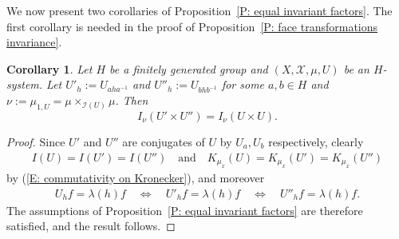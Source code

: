 \documentclass[11pt]{amsart}
\newtheorem{corollary}[lemma]{Corollary}
\theoremstyle{definition}
\newcommand{\CI}{{\mathcal I}}
\newcommand{\CX}{{\mathcal X}}
\newcommand{\inv}{^{-1}}
\newcommand{\1}{{\mathbf{1}}}
\begin{document}
{We now present two corollaries of Proposition~\ref{P: equal invariant factors}.}
The first corollary is needed in the proof of Proposition~\ref{P: face transformations invariance}.
\begin{corollary}\label{C: equal invariant factors 2}
        Let $H$ be a finitely generated group and $(X,\CX, \mu, U)$ be an $H$-system. Let $U'_h:=U_{aha\inv}$ and $U''_h:=U_{bhb\inv}$ for some $a,b\in H$ and $\nu:=\mu_{1,U} = \mu\times_{\CI(U)}\mu$. Then $$I_\nu(U'\times U'') = I_\nu(U\times U).$$
\end{corollary}
\begin{proof}
    Since $U'$ and $U''$ are conjugates of $U$ by $U_a, U_b$ respectively, clearly %
    \begin{align*}
        I(U) = I(U')=I(U'')\quad \textrm{and}\quad K_{\mu_x}(U) = K_{\mu_x}(U') = K_{\mu_x}(U'')
    \end{align*}
    by (\ref{E: commutativity on Kronecker}),
    and moreover
    \begin{align}\label{eerr}
    U_h f = \lambda(h)f  \quad \iff \quad U'_h f = \lambda(h)f \quad \iff \quad U''_h f = \lambda(h)f.
    \end{align}
    The assumptions of Proposition~\ref{P: equal invariant factors} are therefore satisfied, and the result follows.
\end{proof}
\end{document}
